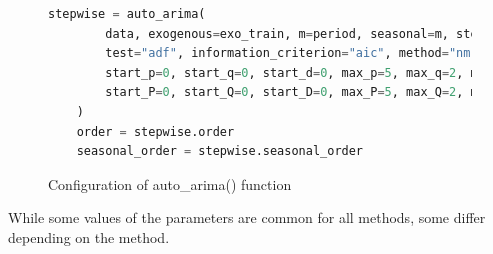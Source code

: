 \documentclass[]{usiinfbachelorproject}
\begin{document}
\begin{figure}[htp!]
    \begin{lstlisting}[language=Python]
    stepwise = auto_arima(
        data, exogenous=exo_train, m=period, seasonal=m, stepwise=True,
        test="adf", information_criterion="aic", method="nm", maxiter=100,
        start_p=0, start_q=0, start_d=0, max_p=5, max_q=2, max_d=5, 
        start_P=0, start_Q=0, start_D=0, max_P=5, max_Q=2, max_D=5, 
    )
    order = stepwise.order
    seasonal_order = stepwise.seasonal_order
    \end{lstlisting}
    \caption{Configuration of auto\_arima() function}
    \label{fig:autoarimaconfig}
\end{figure}

While some values of the parameters are common for all methods, some differ depending on the method.
\end{document}
